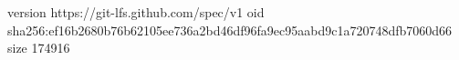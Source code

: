 version https://git-lfs.github.com/spec/v1
oid sha256:ef16b2680b76b62105ee736a2bd46df96fa9ec95aabd9c1a720748dfb7060d66
size 174916
